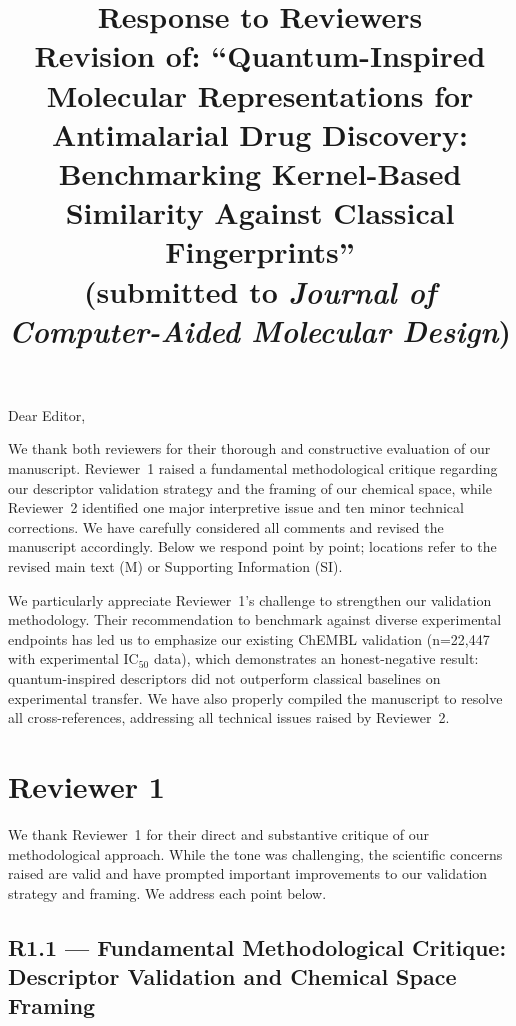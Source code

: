 \documentclass[11pt]{article}
\title{\bfseries Response to Reviewers\\[4pt]
\large Revision of: ``Quantum-Inspired Molecular Representations for Antimalarial Drug Discovery: 
Benchmarking Kernel-Based Similarity Against Classical Fingerprints''\\
(submitted to \emph{Journal of Computer-Aided Molecular Design})}
\author{}
\date{}
\begin{document}
\maketitle

\noindent Dear Editor,

We thank both reviewers for their thorough and constructive evaluation of our manuscript. 
Reviewer~1 raised a fundamental methodological critique regarding our descriptor validation 
strategy and the framing of our chemical space, while Reviewer~2 identified one major 
interpretive issue and ten minor technical corrections. We have carefully considered all 
comments and revised the manuscript accordingly. Below we respond point by point; 
locations refer to the revised main text (M) or Supporting Information (SI).

We particularly appreciate Reviewer~1's challenge to strengthen our validation methodology. 
Their recommendation to benchmark against diverse experimental endpoints has led us to emphasize 
our existing ChEMBL validation (n=22,447 with experimental IC$_{50}$ data), which demonstrates 
an honest-negative result: quantum-inspired descriptors did not outperform classical baselines 
on experimental transfer. We have also properly compiled the manuscript to resolve all 
cross-references, addressing all technical issues raised by Reviewer~2.

\section*{Reviewer 1}

We thank Reviewer~1 for their direct and substantive critique of our methodological approach. 
While the tone was challenging, the scientific concerns raised are valid and have prompted 
important improvements to our validation strategy and framing. We address each point below.

\subsection*{R1.1 --- Fundamental Methodological Critique: Descriptor Validation and 
Chemical Space Framing}
\end{document}
